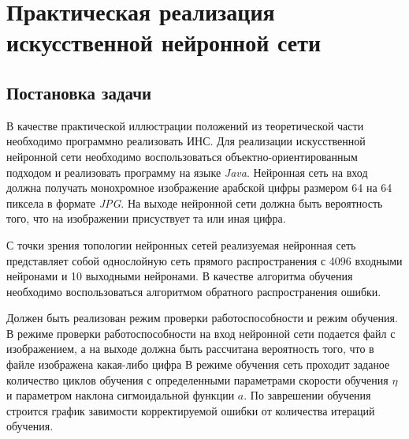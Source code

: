 \chapter{Практическая реализация искусственной нейронной сети}	
\section{Постановка задачи}

В качестве практической иллюстрации положений из теоретической части необходимо программно реализовать ИНС.
Для реализации искусственной нейронной сети необходимо воспользоваться объектно-ориентированным подходом и реализовать программу на языке {\it Java}.
Нейронная сеть на вход должна получать монохромное изображение арабской цифры размером 64 на 64 пиксела в формате {\it JPG}.
На выходе нейронной сети должна быть вероятность того, что на изображении присуствует та или иная цифра.

С точки зрения топологии нейронных сетей реализуемая нейронная сеть представляет собой однослойную сеть прямого распространения с 4096 входными нейронами и 10 выходными нейронами.
В качестве алгоритма обучения необходимо воспользоваться алгоритмом обратного распространения ошибки.

Должен быть реализован режим проверки работоспособности и режим обучения.
В режиме проверки работоспособности на вход нейронной сети подается файл с изображением, а на выходе должна быть рассчитана вероятность того, что в файле изображена какая-либо цифра
В режиме обучения сеть проходит заданое количество циклов обучения с определенными параметрами скорости обучения $\eta$ и параметром наклона сигмоидальной функции $a$.
По заврешении обучения строится график завимости корректируемой ошибки от количества итераций обучения.

